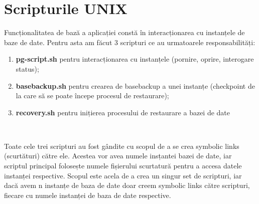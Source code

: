 \section{Scripturile UNIX}
Funcționalitatea de bază a aplicației constă în interacționarea cu instanțele de baze de date. Pentru asta am făcut 3 scripturi ce au urmatoarele responsabilități:
\begin{enumerate}
\item \textbf{pg-script.sh} pentru interacționarea cu instanțele (pornire, oprire, interogare status);
\\
\item \textbf{basebackup.sh} pentru crearea de basebackup a unei instanțe (checkpoint de la care să se poate începe procesul de restaurare);
\\
\item \textbf{recovery.sh} pentru inițierea procesului de restaurare a bazei de date
\\
\end{enumerate}\
\par
Toate cele trei scripturi au fost gândite cu scopul de a se crea symbolic links (scurtături) către ele. Acestea vor avea numele insțantei bazei de date, iar scriptul principal folosește numele fișierului scurtatură pentru a accesa datele instanței respective. Scopul este acela de a crea un singur set de scripturi, iar dacă avem n instanțe de baza de date doar creem symbolic links către scripturi, fiecare cu numele instanței de baza de date respective.
\newpage
